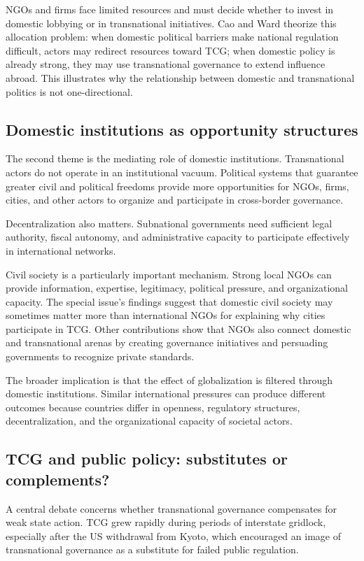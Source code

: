 NGOs and firms face limited resources and must decide whether to invest in domestic lobbying or in transnational initiatives. Cao and Ward theorize this allocation problem: when domestic political barriers make national regulation difficult, actors may redirect resources toward TCG; when domestic policy is already strong, they may use transnational governance to extend influence abroad. This illustrates why the relationship between domestic and transnational politics is not one-directional.

\subsection{Domestic institutions as opportunity structures}

The second theme is the mediating role of domestic institutions. Transnational actors do not operate in an institutional vacuum. Political systems that guarantee greater civil and political freedoms provide more opportunities for NGOs, firms, cities, and other actors to organize and participate in cross-border governance.

Decentralization also matters. Subnational governments need sufficient legal authority, fiscal autonomy, and administrative capacity to participate effectively in international networks.

Civil society is a particularly important mechanism. Strong local NGOs can provide information, expertise, legitimacy, political pressure, and organizational capacity. The special issue's findings suggest that domestic civil society may sometimes matter more than international NGOs for explaining why cities participate in TCG. Other contributions show that NGOs also connect domestic and transnational arenas by creating governance initiatives and persuading governments to recognize private standards.

The broader implication is that the effect of globalization is filtered through domestic institutions. Similar international pressures can produce different outcomes because countries differ in openness, regulatory structures, decentralization, and the organizational capacity of societal actors.

\subsection{TCG and public policy: substitutes or complements?}

A central debate concerns whether transnational governance compensates for weak state action. TCG grew rapidly during periods of interstate gridlock, especially after the US withdrawal from Kyoto, which encouraged an image of transnational governance as a substitute for failed public regulation.

